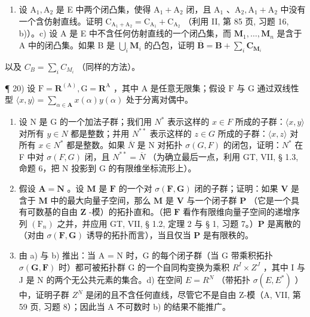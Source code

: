 \begin{enumerate}
\def\labelenumi{\alph{enumi})}
\setcounter{enumi}{1}
\tightlist
\item
  设 \(\mathrm{A}_1, \mathrm{A}_2\) 是 E 中两个闭凸集，使得 \(\mathrm{A}_1 + \mathrm{A}_2\) 闭，且 \(\mathrm{A}_1\) 、\(\mathrm{A}_2, \mathrm{A}_1 + \mathrm{A}_2\) 中没有一个含仿射直线。证明 \(\mathrm{C}_{\mathrm{A}_1 + \mathrm{A}_2} = \mathrm{C}_{\mathrm{A}_1} + \mathrm{C}_{\mathrm{A}_2}\) （利用 II, 第 85 页, 习题 16, b)）。c) 设 A 是 E 中不含任何仿射直线的一个闭凸集，而 \(\mathbf{M}_1, \dots, \mathbf{M}_n\) 是含于 A 中的闭凸集。如果 B 是 \(\bigcup_{i} \mathbf{M}_i\) 的凸包，证明 \(\overline{\mathbf{B}} = \mathbf{B} + \sum_{i} \mathbf{C}_{\mathbf{M}_i}\)
\end{enumerate}

以及 \(C_B = \sum_i C_{M_i}\) （同样的方法）。

¶ 20) 设 \(\mathrm{F} = \mathbf{R}^{(\mathrm{A})}, \mathrm{G} = \mathbf{R}^{\mathrm{A}}\) ，其中 \(\mathrm{A}\) 是任意无限集；假设 \(\mathrm{F}\) 与 \(\mathrm{G}\) 通过双线性型 \(\langle x, y \rangle = \sum_{\alpha \in \mathbf{A}} x(\alpha) y(\alpha)\) 处于分离对偶中。

\begin{enumerate}
\def\labelenumi{\alph{enumi})}
\item
  设 N 是 G 的一个加法子群；我们用 \(N^{*}\) 表示这样的 \(x \in F\) 所成的子群：\(\langle x, y \rangle\) 对所有 \(y \in N\) 都是整数；并用 \(N^{**}\) 表示这样的 \(z \in G\) 所成的子群：\(\langle x, z \rangle\) 对所有 \(x \in N^{*}\) 都是整数。如果 \(\overline{N}\) 是 N 对拓扑 \(\sigma(G, F)\) 的闭包，证明：\(N^{*}\) 在 F 中对 \(\sigma(F, G)\) 闭，且 \(N^{**} = \overline{N}\) （为确立最后一点，利用 GT, VII, § 1.3, 命题 6，把 N 投影到 G 的有限维坐标流形上）。
\item
  假设 \(\mathbf{A} = \mathbf{N}\) 。设 \(\mathbf{M}\) 是 \(\mathbf{F}\) 的一个对 \(\sigma(\mathbf{F},\mathbf{G})\) 闭的子群；证明：如果 \(\mathbf{V}\) 是含于 \(\mathbf{M}\) 中的最大向量子空间，那么 \(\mathbf{M}\) 是 \(\mathbf{V}\) 与一个闭子群 \(\mathbf{P}\) （它是一个具有可数基的自由 \(\mathbf{Z}\) -模）的拓扑直和。（把 \(\mathbf{F}\) 看作有限维向量子空间的递增序列 \((\mathrm{F}_n)\) 之并，并应用 GT, VII, § 1.2, 定理 2 与 § 1, 习题 7。）\(\mathbf{P}\) 是离散的（对由 \(\sigma(\mathbf{F},\mathbf{G})\) 诱导的拓扑而言），当且仅当 \(\mathbf{P}\) 是有限秩的。
\item
  由 a) 与 b) 推出：当 A = N 时，G 的每个闭子群（当 G 带乘积拓扑 \(\sigma(\mathbf{G}, \mathbf{F})\) 时）都可被拓扑群 G 的一个自同构变换为乘积 \(R^{I} \times Z^{J}\) ，其中 I 与 J 是 N 的两个无公共元素的集合。d) 在空间 \(E = R^{N}\) （带拓扑 \(\sigma(E, E^{*})\) ）中，证明子群 \(Z^{N}\) 是闭的且不含任何直线，尽管它不是自由 Z-模（A, VII, 第 59 页, 习题 8）；因此当 A 不可数时 b) 的结果不能推广。
\end{enumerate}

